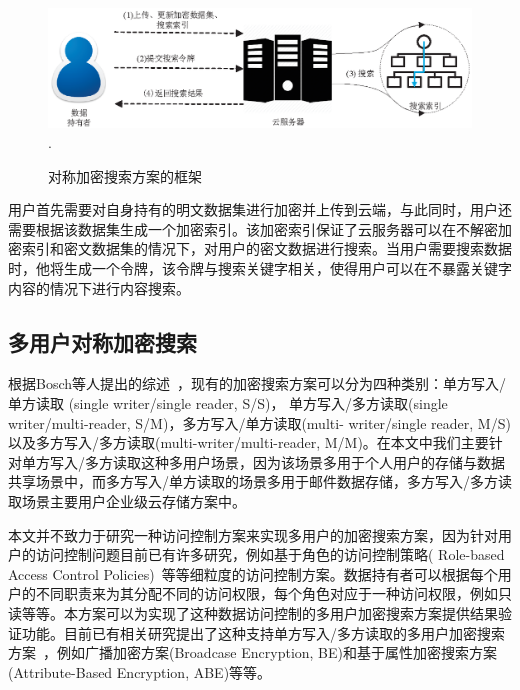 \begin{figure}[h]
\centering
\includegraphics[width=6 in]{fig/SSE}
\DeclareGraphicsExtensions.
\caption{对称加密搜索方案的框架}
\label{fig:SSE}
\end{figure}

用户首先需要对自身持有的明文数据集进行加密并上传到云端，与此同时，用户还需要根据该数据集生成一个加密索引。该加密索引保证了云服务器可以在不解密加密索引和密文数据集的情况下，对用户的密文数据进行搜索。当用户需要搜索数据时，他将生成一个令牌，该令牌与搜索关键字相关，使得用户可以在不暴露关键字内容的情况下进行内容搜索。



\subsection{多用户对称加密搜索}

根据Bosch等人提出的综述~\cite{bosch2015survey}，现有的加密搜索方案可以分为四种类别：单方写入/单方读取 (single writer/single reader, S/S)， 单方写入/多方读取(single writer/multi-reader, S/M)，多方写入/单方读取(multi- writer/single reader, M/S) 以及多方写入/多方读取(multi-writer/multi-reader, M/M)。在本文中我们主要针对单方写入/多方读取这种多用户场景，因为该场景多用于个人用户的存储与数据共享场景中，而多方写入/单方读取的场景多用于邮件数据存储，多方写入/多方读取场景主要用户企业级云存储方案中。

本文并不致力于研究一种访问控制方案来实现多用户的加密搜索方案，因为针对用户的访问控制问题目前已有许多研究，例如基于角色的访问控制策略( Role-based Access Control Policies)~\cite{sandhu1996role,ferraiolo2001proposed}等等细粒度的访问控制方案。数据持有者可以根据每个用户的不同职责来为其分配不同的访问权限，每个角色对应于一种访问权限，例如只读等等。本方案可以为实现了这种数据访问控制的多用户加密搜索方案提供结果验证功能。目前已有相关研究提出了这种支持单方写入/多方读取的多用户加密搜索方案~\cite{curtmola2011searchable, jarecki2013outsourced,sun2016efficient}，例如广播加密方案(Broadcase Encryption, BE)和基于属性加密搜索方案(Attribute-Based Encryption, ABE)等等。

